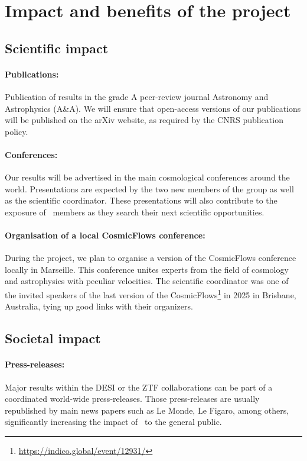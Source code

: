 \section{Impact and benefits of the project}

\subsection{Scientific impact}

\paragraph{Publications:}
Publication of results in the grade A peer-review journal 
Astronomy and Astrophysics (A\&A). 
We will ensure that open-access versions of our publications
will be published on the arXiv website, as required by the 
CNRS publication policy. 

\paragraph{Conferences:} 
Our results will be advertised in the main cosmological 
conferences around the world. Presentations are expected by 
the two new members of the group as well as the scientific
coordinator. These presentations will also contribute to 
the exposure of \projacro\ members as they search their 
next scientific opportunities. 

\paragraph{Organisation of a local CosmicFlows conference:}
During the project, we plan to organise a version of the
CosmicFlows conference locally in Marseille. This conference 
unites experts from the field of cosmology and astrophysics 
with peculiar velocities. The scientific coordinator was 
one of the invited speakers of the last version of the 
CosmicFlows\footnote{\url{https://indico.global/event/12931/}}
in 2025 in Brisbane, Australia, tying up good links with their 
organizers. 

\subsection{Societal impact}

\paragraph{Press-releases:}
Major results within the DESI or the ZTF collaborations 
can be part of a coordinated world-wide press-releases. 
Those press-releases are usually republished by main 
news papers such as Le Monde, Le Figaro, among others, 
significantly increasing the impact of \projacro\ to the
general public. 

